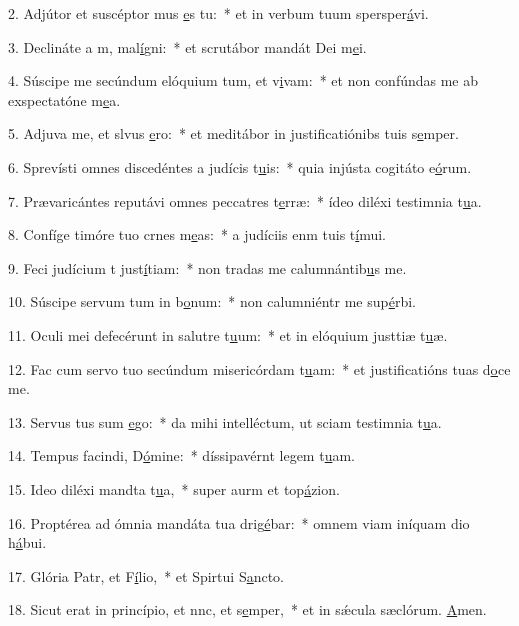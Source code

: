 2. Adjútor et suscéptor mus \uline{e}s tu:~* et in verbum tuum spersper\uline{á}vi.\par 
3. Declináte a m, mal\uline{í}gni:~* et scrutábor mandát Dei m\uline{e}i.\par 
4. Súscipe me secúndum elóquium tum, et v\uline{i}vam:~* et non confúndas me ab exspectatóne m\uline{e}a.\par 
5. Adjuva me, et slvus \uline{e}ro:~* et meditábor in justificatiónibs tuis s\uline{e}mper.\par 
6. Sprevísti omnes discedéntes a judícis t\uline{u}is:~* quia injústa cogitáto e\uline{ó}rum.\par 
7. Prævaricántes reputávi omnes peccatres t\uline{e}rræ:~* ídeo diléxi testimnia t\uline{u}a.\par 
8. Confíge timóre tuo crnes m\uline{e}as:~* a judíciis enm tuis t\uline{í}mui.\par 
9. Feci judícium t just\uline{í}tiam:~* non tradas me calumnántib\uline{u}s me.\par 
10. Súscipe servum tum in b\uline{o}num:~* non calumniéntr me sup\uline{é}rbi.\par 
11. Oculi mei defecérunt in salutre t\uline{u}um:~* et in elóquium justtiæ t\uline{u}æ.\par 
12. Fac cum servo tuo secúndum misericórdam t\uline{u}am:~* et justificatións tuas d\uline{o}ce me.\par 
13. Servus tus sum \uline{e}go:~* da mihi intelléctum, ut sciam testimnia t\uline{u}a.\par 
14. Tempus facindi, D\uline{ó}mine:~* díssipavérnt legem t\uline{u}am.\par 
15. Ideo diléxi mandta t\uline{u}a,~* super aurm et top\uline{á}zion.\par 
16. Proptérea ad ómnia mandáta tua drig\uline{é}bar:~* omnem viam iníquam dio h\uline{á}bui.\par 
17. Glória Patr, et F\uline{í}lio,~* et Spirtui S\uline{a}ncto.\par 
18. Sicut erat in princípio, et nnc, et s\uline{e}mper,~* et in sǽcula sæclórum. \uline{A}men.\par 
